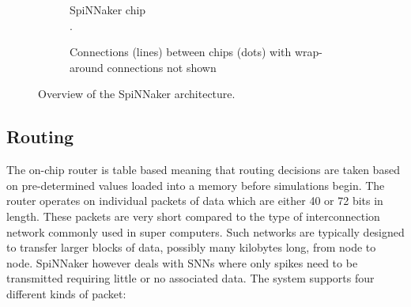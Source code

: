 			\begin{figure}
				\center
				\begin{subfigure}[b]{0.49\textwidth}
					\center
					
					\caption{SpiNNaker chip\\\color{white}.}
					\label{fig:spinnaker-chip}
				\end{subfigure}
				\begin{subfigure}[b]{0.49\textwidth}
					\center
					
					\caption{Connections (lines) between chips (dots) with wrap-around
					connections not shown}
					\label{fig:spinnaker-chips}
				\end{subfigure}
				
				\caption{Overview of the SpiNNaker architecture.}
				\label{fig:spinnaker-architecture}
			\end{figure}
		
		\subsection{Routing}
			
			
			The on-chip router is table based meaning that routing decisions are taken
			based on pre-determined values loaded into a memory before simulations
			begin. The router operates on individual packets of data which are either
			40 or 72 bits in length. These packets are very short compared to the type
			of interconnection network commonly used in super computers. Such networks
			are typically designed to transfer larger blocks of data, possibly many
			kilobytes long, from node to node. SpiNNaker however deals with SNNs where
			only spikes need to be transmitted requiring little or no associated data.
			The system supports four different kinds of packet:
			

